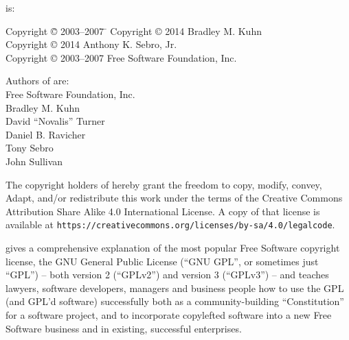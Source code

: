 {\parindent 0in
 is: \\
\begin{tabbing}
Copyright \= \copyright{} 2003--2007 \hspace{.1mm} \=  \kill
Copyright \> \copyright{} 2014 \> Bradley M. Kuhn \\
Copyright \> \copyright{} 2014 \>  Anthony K. Sebro, Jr. \\
Copyright \> \copyright{} 2003--2007 \>  Free Software Foundation, Inc.
\end{tabbing}


\vspace{1in}

\begin{center}
Authors of  are: \\


Free Software Foundation, Inc. \\
Bradley M. Kuhn \\
David ``Novalis'' Turner \\
Daniel B. Ravicher \\
Tony Sebro \\
John Sullivan

\vspace{.3in}

The copyright holders of  hereby grant the freedom to copy, modify,
convey, Adapt, and/or redistribute this work under the terms of the Creative
Commons Attribution Share Alike 4.0 International License.  A copy of that
license is available at
\verb=https://creativecommons.org/licenses/by-sa/4.0/legalcode=.
\end{center}
}

\bigskip

\bigskip

 gives a
comprehensive explanation of the most popular Free Software copyright
license, the GNU General Public License (``GNU GPL'', or sometimes just
``GPL'') -- both version 2 (``GPLv2'') and version 3 (``GPLv3'') -- and
teaches lawyers, software developers, managers and business people how to use
the GPL (and GPL'd software) successfully both as a community-building
``Constitution'' for a software project, and to incorporate copylefted
software into a new Free Software business and in existing, successful
enterprises.

